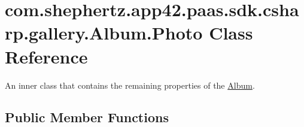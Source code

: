 \hypertarget{classcom_1_1shephertz_1_1app42_1_1paas_1_1sdk_1_1csharp_1_1gallery_1_1_album_1_1_photo}{\section{com.\+shephertz.\+app42.\+paas.\+sdk.\+csharp.\+gallery.\+Album.\+Photo Class Reference}
\label{classcom_1_1shephertz_1_1app42_1_1paas_1_1sdk_1_1csharp_1_1gallery_1_1_album_1_1_photo}
}


An inner class that contains the remaining properties of the \hyperlink{classcom_1_1shephertz_1_1app42_1_1paas_1_1sdk_1_1csharp_1_1gallery_1_1_album}{Album}.  


\subsection*{Public Member Functions}
